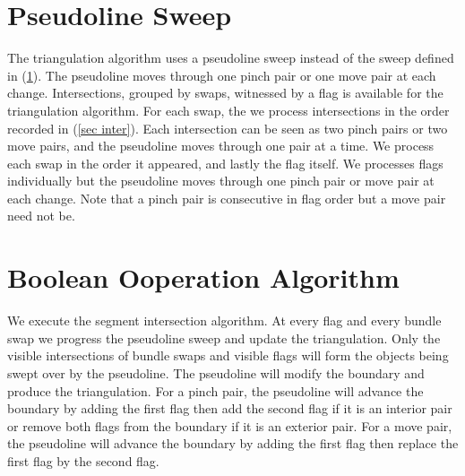 \documentclass[11pt]{article}
\begin{document}
\section{Pseudoline Sweep} \label{sec sweep}
The triangulation algorithm uses a pseudoline sweep instead of the sweep defined in (\ref{sec sweep}).
The pseudoline moves through one pinch pair or one move pair at each change.
Intersections, grouped by swaps, witnessed by a flag is available for the triangulation algorithm.
For each swap, the we process intersections in the order recorded in (\ref{sec inter}).
Each intersection can be seen as two pinch pairs or two move pairs, and the pseudoline moves through one pair at a time.
We process each swap in the order it appeared, and lastly the flag itself.
We processes flags individually but the pseudoline moves through one pinch pair or move pair at each change.
Note that a pinch pair is consecutive in flag order but a move pair need not be.

\section{Boolean Ooperation Algorithm}
We execute the segment intersection algorithm.
At every flag and every bundle swap we progress the pseudoline sweep and update the triangulation.
Only the visible intersections of bundle swaps and visible flags will form the objects being swept over by the pseudoline.
The pseudoline will modify the boundary and produce the triangulation.
For a pinch pair, the pseudoline will advance the boundary by adding the first flag then add the second flag if it is an interior pair or remove both flags from the boundary if it is an exterior pair.
For a move pair, the pseudoline will advance the boundary by adding the first flag then replace the first flag by the second flag.
\end{document}
